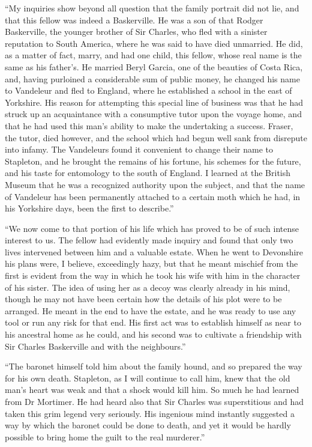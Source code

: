 \documentclass[paper=5.5in:8.5in,BCOR=7mm,twoside,DIV=calc,12pt,usegeometry,openany,chapterprefix,endperiod]{scrbook} %
\begin{document}
\enquote{My inquiries show beyond all question that the family portrait did not lie, and that this fellow was indeed a Baskerville. He was a son of that Rodger Baskerville, the younger brother of Sir Charles, who fled with a sinister reputation to South America, where he was said to have died unmarried. He did, as a matter of fact, marry, and had one child, this fellow, whose real name is the same as his father's. He married Beryl Garcia, one of the beauties of Costa Rica, and, having purloined a considerable sum of public money, he changed his name to Vandeleur and fled to England, where he established a school in the east of Yorkshire. His reason for attempting this special line of business was that he had struck up an acquaintance with a consumptive tutor upon the voyage home, and that he had used this man's ability to make the undertaking a success. Fraser, the tutor, died however, and the school which had begun well sank from disrepute into infamy. The Vandeleurs found it convenient to change their name to Stapleton, and he brought the remains of his fortune, his schemes for the future, and his taste for entomology to the south of England. I learned at the British Museum that he was a recognized authority upon the subject, and that the name of Vandeleur has been permanently attached to a certain moth which he had, in his Yorkshire days, been the first to describe.}

\enquote{We now come to that portion of his life which has proved to be of such intense interest to us. The fellow had evidently made inquiry and found that only two lives intervened between him and a valuable estate. When he went to Devonshire his plans were, I believe, exceedingly hazy, but that he meant mischief from the first is evident from the way in which he took his wife with him in the character of his sister. The idea of using her as a decoy was clearly already in his mind, though he may not have been certain how the details of his plot were to be arranged. He meant in the end to have the estate, and he was ready to use any tool or run any risk for that end. His first act was to establish himself as near to his ancestral home as he could, and his second was to cultivate a friendship with Sir Charles Baskerville and with the neighbours.}

\enquote{The baronet himself told him about the family hound, and so prepared the way for his own death. Stapleton, as I will continue to call him, knew that the old man's heart was weak and that a shock would kill him. So much he had learned from Dr Mortimer. He had heard also that Sir Charles was superstitious and had taken this grim legend very seriously. His ingenious mind instantly suggested a way by which the baronet could be done to death, and yet it would be hardly possible to bring home the guilt to the real murderer.}
\end{document}
